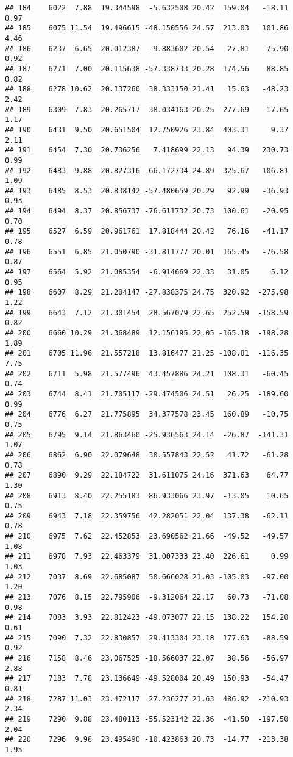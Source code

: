 \documentclass[]{article}
\begin{document}
\begin{verbatim}
## 184    6022  7.88  19.344598  -5.632508 20.42  159.04   -18.11  0.97
## 185    6075 11.54  19.496615 -48.150556 24.57  213.03   101.86  4.46
## 186    6237  6.65  20.012387  -9.883602 20.54   27.81   -75.90  0.92
## 187    6271  7.00  20.115638 -57.338733 20.28  174.56    88.85  0.82
## 188    6278 10.62  20.137260  38.333150 21.41   15.63   -48.23  2.42
## 189    6309  7.83  20.265717  38.034163 20.25  277.69    17.65  1.17
## 190    6431  9.50  20.651504  12.750926 23.84  403.31     9.37  2.11
## 191    6454  7.30  20.736256   7.418699 22.13   94.39   230.73  0.99
## 192    6483  9.88  20.827316 -66.172734 24.89  325.67   106.81  1.09
## 193    6485  8.53  20.838142 -57.480659 20.29   92.99   -36.93  0.93
## 194    6494  8.37  20.856737 -76.611732 20.73  100.61   -20.95  0.70
## 195    6527  6.59  20.961761  17.818444 20.42   76.16   -41.17  0.78
## 196    6551  6.85  21.050790 -31.811777 20.01  165.45   -76.58  0.87
## 197    6564  5.92  21.085354  -6.914669 22.33   31.05     5.12  0.95
## 198    6607  8.29  21.204147 -27.838375 24.75  320.92  -275.98  1.22
## 199    6643  7.12  21.301454  28.567079 22.65  252.59  -158.59  0.82
## 200    6660 10.29  21.368489  12.156195 22.05 -165.18  -198.28  1.89
## 201    6705 11.96  21.557218  13.816477 21.25 -108.81  -116.35  7.75
## 202    6711  5.98  21.577496  43.457886 24.21  108.31   -60.45  0.74
## 203    6744  8.41  21.705117 -29.474506 24.51   26.25  -189.60  0.99
## 204    6776  6.27  21.775895  34.377578 23.45  160.89   -10.75  0.75
## 205    6795  9.14  21.863460 -25.936563 24.14  -26.87  -141.31  1.07
## 206    6862  6.90  22.079648  30.557843 22.52   41.72   -61.28  0.78
## 207    6890  9.29  22.184722  31.611075 24.16  371.63    64.77  1.30
## 208    6913  8.40  22.255183  86.933066 23.97  -13.05    10.65  0.75
## 209    6943  7.18  22.359756  42.282051 22.04  137.38   -62.11  0.78
## 210    6975  7.62  22.452853  23.690562 21.66  -49.52   -49.57  1.08
## 211    6978  7.93  22.463379  31.007333 23.40  226.61     0.99  1.03
## 212    7037  8.69  22.685087  50.666028 21.03 -105.03   -97.00  1.20
## 213    7076  8.15  22.795906  -9.312064 22.17   60.73   -71.08  0.98
## 214    7083  3.93  22.812423 -49.073077 22.15  138.22   154.20  0.61
## 215    7090  7.32  22.830857  29.413304 23.18  177.63   -88.59  0.92
## 216    7158  8.46  23.067525 -18.566037 22.07   38.56   -56.97  2.88
## 217    7183  7.78  23.136649 -49.528004 20.49  150.93   -54.47  0.81
## 218    7287 11.03  23.472117  27.236277 21.63  486.92  -210.93  2.34
## 219    7290  9.88  23.480113 -55.523142 22.36  -41.50  -197.50  2.04
## 220    7296  9.98  23.495490 -10.423863 20.73  -14.77  -213.38  1.95

\end{verbatim}
\end{document}
